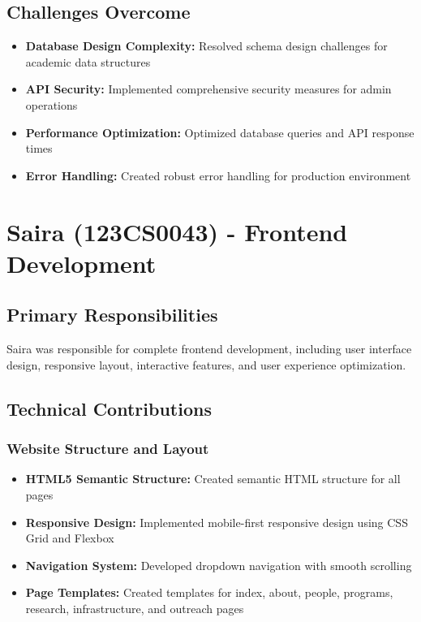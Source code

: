 \documentclass[12pt,a4paper]{report}
\begin{document}
\subsection{Challenges Overcome}
\begin{itemize}
    \item \textbf{Database Design Complexity:} Resolved schema design challenges for academic data structures
    \item \textbf{API Security:} Implemented comprehensive security measures for admin operations
    \item \textbf{Performance Optimization:} Optimized database queries and API response times
    \item \textbf{Error Handling:} Created robust error handling for production environment
\end{itemize}

\section{Saira (123CS0043) - Frontend Development}

\subsection{Primary Responsibilities}
Saira was responsible for complete frontend development, including user interface design, responsive layout, interactive features, and user experience optimization.

\subsection{Technical Contributions}

\subsubsection{Website Structure and Layout}
\begin{itemize}
    \item \textbf{HTML5 Semantic Structure:} Created semantic HTML structure for all pages
    \item \textbf{Responsive Design:} Implemented mobile-first responsive design using CSS Grid and Flexbox
    \item \textbf{Navigation System:} Developed dropdown navigation with smooth scrolling
    \item \textbf{Page Templates:} Created templates for index, about, people, programs, research, infrastructure, and outreach pages
\end{itemize}
\end{document}
